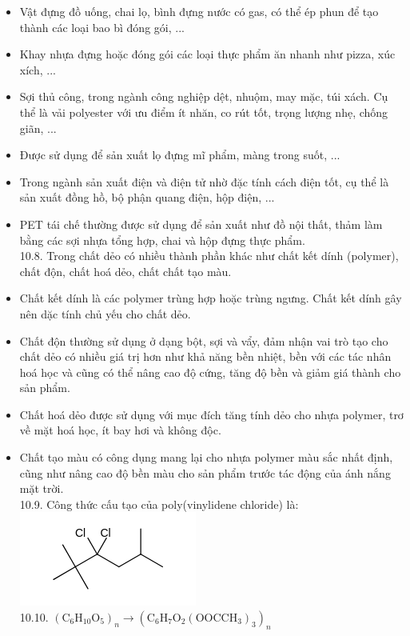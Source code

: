 \documentclass[10pt]{article}
\begin{document}
\begin{itemize}
  \item Vật đựng đồ uống, chai lọ, bình đựng nước có gas, có thể ép phun để tạo thành các loại bao bì đóng gói, ...
  \item Khay nhựa đựng hoặc đóng gói các loại thực phẩm ăn nhanh như pizza, xúc xích, ...
  \item Sợi thủ công, trong ngành công nghiệp dệt, nhuộm, may mặc, túi xách. Cụ thể là vải polyester với ưu điểm ít nhăn, co rút tốt, trọng lượng nhẹ, chống giãn, ...
  \item Được sử dụng để sản xuất lọ đựng mĩ phẩm, màng trong suốt, ...
  \item Trong ngành sản xuất điện và điện tử nhờ đặc tính cách điện tốt, cụ thể là sản xuất đồng hồ, bộ phận quang điện, hộp điện, ...
  \item PET tái chế thường được sử dụng để sản xuất như đồ nội thất, thảm làm bằng các sợi nhựa tổng hợp, chai và hộp đựng thực phẩm.\\
10.8. Trong chất dẻo có nhiều thành phần khác như chất kết dính (polymer), chất độn, chất hoá dẻo, chất chất tạo màu.
  \item Chất kết dính là các polymer trùng hợp hoặc trùng ngưng. Chất kết dính gây nên dặc tính chủ yếu cho chất dẻo.
  \item Chất độn thường sử dụng ở dạng bột, sợi và vẩy, đảm nhận vai trò tạo cho chất dẻo có nhiều giá trị hơn như khả năng bền nhiệt, bền với các tác nhân hoá học và cũng có thể nâng cao độ cứng, tăng độ bền và giảm giá thành cho sản phẩm.
  \item Chất hoá dẻo được sử dụng với mục đích tăng tính dẻo cho nhựa polymer, trơ về mặt hoá học, ít bay hơi và không độc.
  \item Chất tạo màu có công dụng mang lại cho nhựa polymer màu sắc nhất định, cũng như nâng cao độ bền màu cho sản phẩm trước tác động của ánh nắng mặt trời.\\
10.9. Công thức cấu tạo của poly(vinylidene chloride) là:\\
\includegraphics{smile-1af5949156f613581fcee7b0547c153b92822209}\\
10.10. $\left(\mathrm{C}_{6} \mathrm{H}_{10} \mathrm{O}_{5}\right)_{n} \longrightarrow\left(\mathrm{C}_{6} \mathrm{H}_{7} \mathrm{O}_{2}\left(\mathrm{OOCCH}_{3}\right)_{3}\right)_{n}$
\end{itemize}
\end{document}
